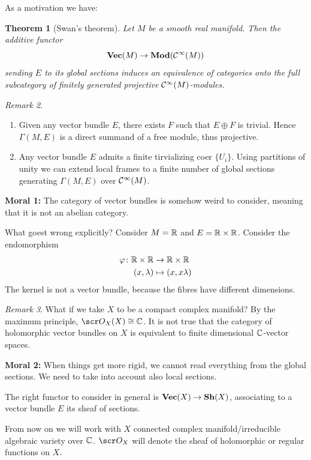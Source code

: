 \documentclass[A4paper, british]{amsart}
\theoremstyle{darkgreentheorem}
\newtheorem{thm}{Theorem}[section]
\theoremstyle{darkbluedefinition}
\theoremstyle{darkredexample}
\theoremstyle{remark}
\newtheorem{rem}[thm]{Remark}
\newcommand{\1}{\mathbbm{1}}
\newcommand{\op}{\oplus}
\newcommand{\tms}{\times}
\begin{document}
As a motivation we have:

\begin{thm}[Swan's theorem]
    Let $M$ be a smooth real manifold.
    Then the additive functor
    \[ \mathbf{Vec}(M)\to \mathbf{Mod}(\mathcal{C}^{\infty}(M)) \]
    sending $E$ to its global sections induces an equivalence of categories onto the full subcategory of finitely generated projective $\mathcal{C}^{\infty}(M)$-modules.
\end{thm}

\begin{rem}
    \begin{enumerate}
	\item Given any vector bundle $E$, there exists $F$ such that $E\op F$ is trivial.
	    Hence $\Gamma(M,E)$ is a direct summand of a free module, thus projective.
	\item Any vector bundle $E$ admits a finite tirvializing coer $\{U_{i}\}$.
	    Using partitions of unity we can extend local frames to a finite number of global sections generating $\Gamma(M,E)$ over $\mathcal{C}^{\infty}(M)$.
    \end{enumerate}
\end{rem}

\textbf{Moral 1:} The category of vector bundles is somehow weird to consider, meaning that it is not an abelian category.

What goest wrong explicitly? Consider $M=\mathbb{R}$ and $E=\R\tms \R$.
Consider the endomorphism
\begin{align*}
    \varphi\colon\R\tms\R&\to \R\tms \R \\
    (x,\lambda)&\mapsto (x,x\lambda)
\end{align*}
The kernel is not a vector bundle, because the fibres have different dimensions.

\begin{rem}
    What if we take $X$ to be a compact complex manifold?
    By the maximum principle, $\O_{X}(X)\cong \C$.
    It is not true that the category of holomorphic vector bundles on $X$ is equivalent to finite dimensional $\mathbb{C}$-vector spaces.
\end{rem}

\textbf{Moral 2:} When things get more rigid, we cannot read everything from the global sections.
We need to take into account also local sections.

The right functor to consider in general is $\mathbf{Vec}(X)\to \mathbf{Sh}(X)$, associating to a vector bundle $E$ its sheaf of sections.

From now on we will work with $X$ connected complex manifold/irreducible algebraic variety over $\mathbb{C}$.
$\O_{X}$ will denote the sheaf of holomorphic or regular functions on $X$.
\end{document}

